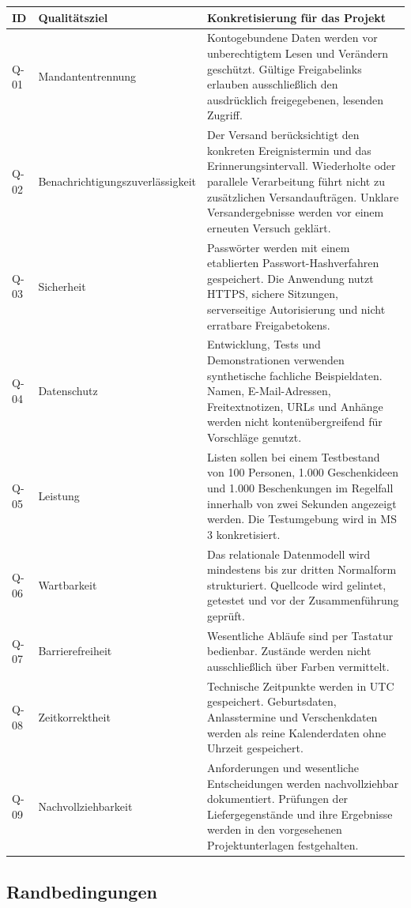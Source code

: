 \documentclass[11pt,a4paper]{article}
\begin{document}
\begin{tabularx}{\linewidth}{@{}l p{3.6cm} Y@{}}
\toprule
\textbf{ID} & \textbf{Qualitätsziel} & \textbf{Konkretisierung für das Projekt} \\
\midrule
\endhead
Q-01 & Mandantentrennung & Kontogebundene Daten werden vor unberechtigtem Lesen und Verändern geschützt. Gültige Freigabelinks erlauben ausschließlich den ausdrücklich freigegebenen, lesenden Zugriff. \\
Q-02 & Benach\-richtigungs\-zuverlässig\-keit & Der Versand berücksichtigt den konkreten Ereignistermin und das Erinnerungsintervall. Wiederholte oder parallele Verarbeitung führt nicht zu zusätzlichen Versandaufträgen. Unklare Versandergebnisse werden vor einem erneuten Versuch geklärt. \\
Q-03 & Sicherheit & Passwörter werden mit einem etablierten Passwort-Hashverfahren gespeichert. Die Anwendung nutzt HTTPS, sichere Sitzungen, serverseitige Autorisierung und nicht erratbare Freigabetokens. \\
Q-04 & Datenschutz & Entwicklung, Tests und Demonstrationen verwenden synthetische fachliche Beispieldaten. Namen, E-Mail-Adressen, Freitextnotizen, URLs und Anhänge werden nicht kontenübergreifend für Vorschläge genutzt. \\
Q-05 & Leistung & Listen sollen bei einem Testbestand von 100 Personen, 1.000 Geschenkideen und 1.000 Beschenkungen im Regelfall innerhalb von zwei Sekunden angezeigt werden. Die Testumgebung wird in MS 3 konkretisiert. \\
Q-06 & Wartbarkeit & Das relationale Datenmodell wird mindestens bis zur dritten Normalform strukturiert. Quellcode wird gelintet, getestet und vor der Zusammenführung geprüft. \\
Q-07 & Barrierefreiheit & Wesentliche Abläufe sind per Tastatur bedienbar. Zustände werden nicht ausschließlich über Farben vermittelt. \\
Q-08 & Zeitkorrektheit & Technische Zeitpunkte werden in UTC gespeichert. Geburtsdaten, Anlasstermine und Verschenkdaten werden als reine Kalenderdaten ohne Uhrzeit gespeichert. \\
Q-09 & Nachvollziehbarkeit & Anforderungen und wesentliche Entscheidungen werden nachvollziehbar dokumentiert. Prüfungen der Liefergegenstände und ihre Ergebnisse werden in den vorgesehenen Projektunterlagen festgehalten. \\
\bottomrule
\end{tabularx}

\subsection{Randbedingungen}
\end{document}
